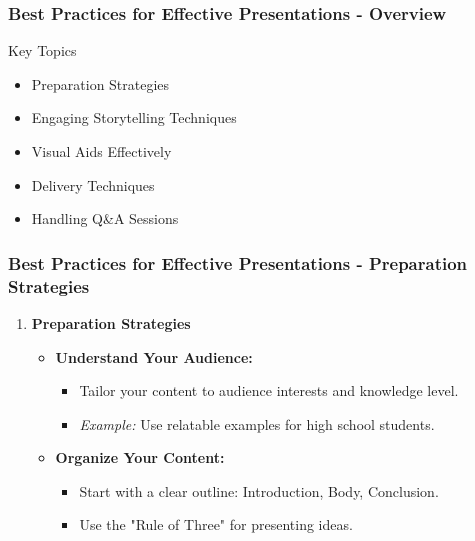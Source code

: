 \documentclass{beamer}
\begin{document}
\begin{frame}[fragile]
    \frametitle{Best Practices for Effective Presentations - Overview}
    \begin{block}{Key Topics}
        \begin{itemize}
            \item Preparation Strategies
            \item Engaging Storytelling Techniques
            \item Visual Aids Effectively
            \item Delivery Techniques
            \item Handling Q\&A Sessions
        \end{itemize}
    \end{block}
\end{frame}

\begin{frame}[fragile]
    \frametitle{Best Practices for Effective Presentations - Preparation Strategies}
    \begin{enumerate}
        \item \textbf{Preparation Strategies}
            \begin{itemize}
                \item \textbf{Understand Your Audience:}
                    \begin{itemize}
                        \item Tailor your content to audience interests and knowledge level.
                        \item \textit{Example:} Use relatable examples for high school students.
                    \end{itemize}

                \item \textbf{Organize Your Content:}
                    \begin{itemize}
                        \item Start with a clear outline: Introduction, Body, Conclusion.
                        \item Use the "Rule of Three" for presenting ideas.
                    \end{itemize}    
            \end{itemize}
    \end{enumerate}
\end{frame}
\end{document}
